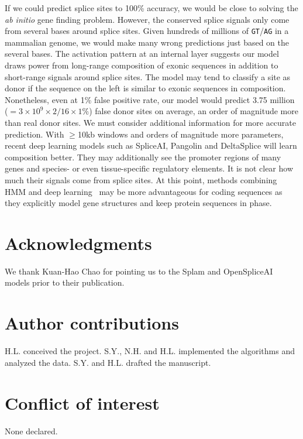 \documentclass[webpdf,contemporary,large,namedate]{oup-authoring-template}%
\begin{document}
If we could predict splice sites to 100\% accuracy, we would be close to solving the \emph{ab initio} gene finding problem.
However, the conserved splice signals only come from several bases around splice sites.
Given hundreds of millions of {\tt GT}/{\tt AG} in a mammalian genome, we would make many wrong predictions just based on the several bases.
The activation pattern at an internal layer suggests our model
draws power from long-range composition of exonic sequences in addition to short-range signals around splice sites.
The model may tend to classify a site as donor if the sequence on the left is similar to exonic sequences in composition.
Nonetheless, even at 1\% false positive rate, our model would predict 3.75 million ($=3\times10^9\times2/16\times1\%$) false donor sites on average,
an order of magnitude more than real donor sites.
We must consider additional information for more accurate prediction.
With $\ge$10kb windows and orders of magnitude more parameters, recent deep learning models
such as SpliceAI, Pangolin and DeltaSplice will learn composition better.
They may additionally see the promoter regions of many genes and species- or even tissue-specific regulatory elements.
It is not clear how much their signals come from splice sites.
At this point, methods combining HMM and deep learning~\citep{Gabriel:2024aa,Holst2023.02.06.527280}
may be more advantageous for coding sequences as they explicitly model gene structures and keep protein sequences in phase.

\section*{Acknowledgments}

We thank Kuan-Hao Chao for pointing us to the Splam and OpenSpliceAI models prior to their publication.

\section*{Author contributions}

H.L. conceived the project.
S.Y., N.H. and H.L. implemented the algorithms and analyzed the data.
S.Y. and H.L. drafted the manuscript.

\section*{Conflict of interest}

None declared.
\end{document}
